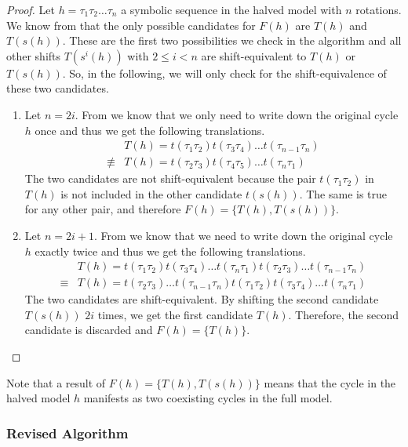 \begin{proof}
	Let $h = \tau_1\tau_2 \dots \tau_n$ a symbolic sequence in the halved model with $n$ rotations.
	We know from  that the only possible candidates for $F(h)$ are $T(h)$ and $T(s(h))$.
	These are the first two possibilities we check in the algorithm and all other shifts $T(s^i(h))$ with $2 \leq i < n$ are shift-equivalent to $T(h)$ or $T(s(h))$.
	So, in the following, we will only check for the shift-equivalence of these two candidates.
	\begin{enumerate}
		\item Let $n = 2i$.
		      From  we know that we only need to write down the original cycle $h$ once and thus we get the following translations.
		      \begin{align*}
			              & T(h) = t(\tau_1\tau_2) t(\tau_3\tau_4) \dots t(\tau_{n-1}\tau_n) \\
			      \nequiv & T(h) = t(\tau_2\tau_3) t(\tau_4\tau_5) \dots t(\tau_n\tau_1)
		      \end{align*}
		      The two candidates are not shift-equivalent because the pair $t(\tau_1\tau_2)$ in $T(h)$ is not included in the other candidate $t(s(h))$.
		      The same is true for any other pair, and therefore $F(h) = \{T(h), T(s(h))\}$.
		\item Let $n = 2i + 1$.
		      From  we know that we need to write down the original cycle $h$ exactly twice and thus we get the following translations.
		      \begin{align*}
			             & T(h) = t(\tau_1\tau_2) t(\tau_3\tau_4) \dots t(\tau_n\tau_1) t(\tau_2\tau_3) \dots t(\tau_{n-1}\tau_n) \\
			      \equiv & T(h) = t(\tau_2\tau_3) \dots t(\tau_{n-1}\tau_n) t(\tau_1\tau_2) t(\tau_3\tau_4) \dots t(\tau_n\tau_1)
		      \end{align*}
		      The two candidates are shift-equivalent.
		      By shifting the second candidate $T(s(h))$ $2i$ times, we get the first candidate $T(h)$.
		      Therefore, the second candidate is discarded and $F(h) = \{T(h)\}$.
	\end{enumerate}
\end{proof}

Note that a result of $F(h) = \{T(h), T(s(h))\}$ means that the cycle in the halved model $h$ manifests as two coexisting cycles in the full model.

\subsubsection{Revised Algorithm}


